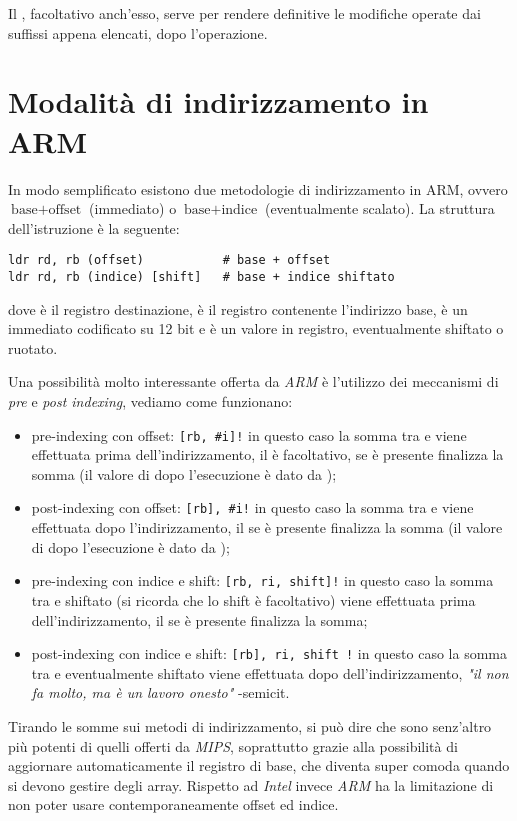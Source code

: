 \documentclass[class=book, crop=false, oneside]{standalone}
\begin{document}
Il \suffix{!}, facoltativo anch'esso, serve per rendere definitive le modifiche operate dai suffissi appena elencati, dopo l'operazione.

\section{Modalità di indirizzamento in ARM}
In modo semplificato esistono due metodologie di indirizzamento in ARM, ovvero \(\textrm{base} + \textrm{offset}\) (immediato) o \(\textrm{base} + \textrm{indice}\) (eventualmente scalato). La struttura dell'istruzione è la seguente:

\begin{verbatim}
ldr rd, rb (offset)           # base + offset
ldr rd, rb (indice) [shift]   # base + indice shiftato
\end{verbatim}
dove  è il registro destinazione,  è il registro contenente l'indirizzo base,  è un immediato codificato su 12 bit e  è un valore in registro, eventualmente shiftato o ruotato.

Una possibilità molto interessante offerta da \emph{ARM} è l'utilizzo dei meccanismi di \emph{pre} e \emph{post indexing}, vediamo come funzionano:

\begin{itemize}
	\item pre-indexing con offset: \texttt{[rb, \#i]!} in questo caso la somma tra  e  viene  effettuata prima dell'indirizzamento, il \register{!} è facoltativo, se è presente finalizza la somma (il valore di  dopo l'esecuzione è dato da );
	\item post-indexing con offset: \texttt{[rb], \#i!} in questo caso la somma tra  e  viene effettuata dopo l'indirizzamento, il \suffix{!} se è presente finalizza la somma (il valore di  dopo l'esecuzione è dato da );
	\item pre-indexing con indice e shift: \texttt{[rb, ri, shift]!} in questo caso la somma tra  e  shiftato (si ricorda che lo shift è facoltativo) viene  effettuata prima dell'indirizzamento, il \suffix{!} se è presente finalizza la somma;
	\item post-indexing con indice e shift: \texttt{[rb], ri, shift !} in questo caso la somma tra  e  eventualmente shiftato viene effettuata dopo dell'indirizzamento, \emph{"il \suffix{!} non fa molto, ma è un lavoro onesto"} -semicit.
\end{itemize}

Tirando le somme sui metodi di indirizzamento, si può dire che sono senz'altro più potenti di quelli offerti da \emph{MIPS}, soprattutto grazie alla possibilità di aggiornare automaticamente il registro di base, che diventa super comoda quando si devono gestire degli array. Rispetto ad \emph{Intel} invece \emph{ARM} ha la limitazione di non poter usare contemporaneamente offset ed indice.
\end{document}
